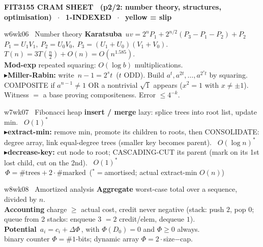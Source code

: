 \documentclass[9pt]{extarticle}
\newcommand{\key}[1]{\colorbox{hl}{\ensuremath{\,#1\,}}}     %
\newcommand{\R}{\textcolor{red!75!black}{$\blacktriangleright$}\;}  %
\begin{document}
\begin{multicols}{3}
\end{multicols}

\clearpage
{\centering\bfseries\small FIT3155 CRAM SHEET \ (p2/2: number theory, structures, optimisation) $\;\cdot\;$ 1-INDEXED $\;\cdot\;$ \colorbox{hl}{yellow = slip}\par}
\vspace{2pt}

\begin{multicols}{3}

\begin{wk}{w6}{wk06 \ Number theory}
\textbf{Karatsuba} \key{uv=2^nP_1+2^{n/2}(P_3{-}P_1{-}P_2)+P_2}\\
$P_1{=}U_1V_1,\ P_2{=}U_0V_0,\ P_3{=}(U_1{+}U_0)(V_1{+}V_0)$.\\
$T(n){=}3T(\tfrac n2){+}O(n){=}O(n^{1.585})$.\\[2pt]
\textbf{Mod-exp} repeated squaring: $O(\log b)$ multiplications.\\[2pt]
\R \textbf{Miller-Rabin:} write \key{n{-}1=2^s t} ($t$ ODD). Build $a^t,a^{2t},\dots,a^{2^s t}$ by squaring.\\
COMPOSITE if $a^{n-1}{\ne}1$ OR a nontrivial $\sqrt1$ appears ($x^2{=}1$ with $x{\ne}\pm1$). Witness $=$ a base proving compositeness. Error $\le4^{-k}$.
\end{wk}

\begin{wk}{w7}{wk07 \ Fibonacci heap}
\textbf{insert / merge} lazy: splice trees into root list, update min. \ $O(1)^*$\\[2pt]
\R \textbf{extract-min:} remove min, promote its children to roots, then CONSOLIDATE: degree array, link equal-degree trees (smaller key becomes parent). \ $O(\log n)^*$\\[2pt]
\R \textbf{decrease-key:} cut node to root; CASCADING-CUT its parent (mark on its 1st lost child, cut on the 2nd). \ $O(1)^*$\\[2pt]
\key{\Phi=\#\text{trees}+2\cdot\#\text{marked}} \quad($^*=$amortised; actual extract-min $O(n)$)
\end{wk}

\begin{wk}{w8}{wk08 \ Amortized analysis}
\textbf{Aggregate} worst-case total over a sequence, divided by $n$.\\[2pt]
\textbf{Accounting} charge $\ge$ actual cost, credit never negative (stack: push $2$, pop $0$; queue from 2 stacks: enqueue $3$ $=2$ credit/elem, dequeue $1$).\\[2pt]
\textbf{Potential} \key{a_i=c_i+\Delta\Phi}, with $\Phi(D_0){=}0$ and $\Phi\ge0$ always.\\
binary counter $\Phi{=}\#1$-bits; dynamic array $\Phi{=}2\cdot$size$-$cap.
\end{wk}


\end{multicols}
\end{document}
